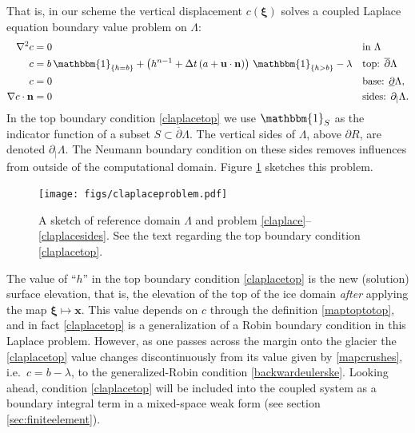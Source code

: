 \documentclass[letterpaper,final,12pt,reqno]{amsart}
\newcommand{\grad}{\nabla}
\newcommand{\bn}{\mathbf{n}}
\newcommand{\bu}{\mathbf{u}}
\newcommand{\bx}{\mathbf{x}}
\newcommand{\bxi}{\bm{\xi}}
\begin{document}
That is, in our scheme the vertical displacement $c(\bxi)$ solves a coupled Laplace equation boundary value problem on $\Lambda$:
\begin{align}
        \grad^2 c &= 0 &&\text{in } \Lambda \label{claplace} \\
                c &= b\, \mathbbm{1}_{\{h=b\}} + \left(h^{n-1} + \Delta t\left(a + \bu \cdot \bn\right)\right)\, \mathbbm{1}_{\{h>b\}} - \lambda &&\text{top: } \overline{\partial} \Lambda  \label{claplacetop} \\
                c &= 0 &&\text{base: } \underline{\partial} \Lambda,  \label{claplacebase} \\
 \grad c\cdot \bn &= 0 &&\text{sides: } \partial_{|} \Lambda.  \label{claplacesides}
\end{align}
In the top boundary condition \eqref{claplacetop} we use $\mathbbm{1}_S$ as the indicator function of a subset $S\subset \overline{\partial} \Lambda$.  The vertical sides of $\Lambda$, above $\partial R$, are denoted $\partial_{|} \Lambda$.  The Neumann boundary condition on these sides removes influences from outside of the computational domain.  Figure \ref{fig:claplaceproblem} sketches this problem.

\begin{figure}[ht]
\begin{center}
\texttt{[image: figs/claplaceproblem.pdf]}
\end{center}
\caption{A sketch of reference domain $\Lambda$ and problem \eqref{claplace}--\eqref{claplacesides}.  See the text regarding the top boundary condition \eqref{claplacetop}.}
\label{fig:claplaceproblem}
\end{figure}

The value of ``$h$'' in the top boundary condition \eqref{claplacetop} is the new (solution) surface elevation, that is, the elevation of the top of the ice domain \emph{after} applying the map $\bxi\mapsto \bx$.  This value depends on $c$ through the definition \eqref{maptoptotop}, and in fact \eqref{claplacetop} is a generalization of a Robin boundary condition in this Laplace problem.  However, as one passes across the margin onto the glacier the \eqref{claplacetop} value changes discontinuously from its value given by \eqref{mapcrushes}, i.e.~$c=b-\lambda$, to the generalized-Robin condition \eqref{backwardeulerske}.  Looking ahead, condition \eqref{claplacetop} will be included into the coupled system as a boundary integral term in a mixed-space weak form (see section \ref{sec:finiteelement}).
\end{document}
